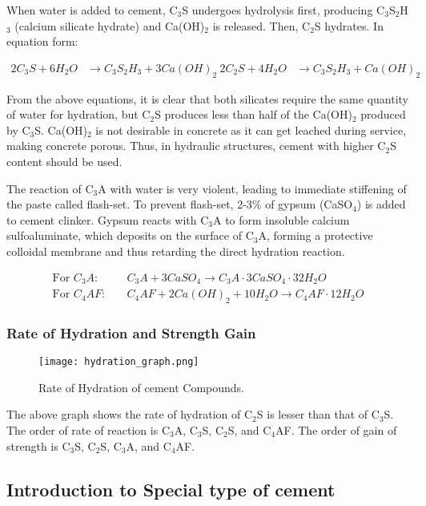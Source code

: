 \documentclass[a4paper,11pt]{book}
\begin{document}
When water is added to cement, C$_3$S undergoes hydrolysis first, producing C$_3$S$_2$H$_3$ (calcium silicate hydrate) and Ca(OH)$_2$ is released. Then, C$_2$S hydrates. In equation form:

\begin{align*}
2C_3S + 6H_2O &\rightarrow C_3S_2H_3 + 3Ca(OH)_2 \
2C_2S + 4H_2O &\rightarrow C_3S_2H_3 + Ca(OH)_2
\end{align*}

From the above equations, it is clear that both silicates require the same quantity of water for hydration, but C$_2$S produces less than half of the Ca(OH)$_2$ produced by C$_3$S. Ca(OH)$_2$ is not desirable in concrete as it can get leached during service, making concrete porous. Thus, in hydraulic structures, cement with higher C$_2$S content should be used.

The reaction of C$_3$A with water is very violent, leading to immediate stiffening of the paste called flash-set. To prevent flash-set, 2-3\% of gypsum (CaSO$_4$) is added to cement clinker. Gypsum reacts with C$_3$A to form insoluble calcium sulfoaluminate, which deposits on the surface of C$_3$A, forming a protective colloidal membrane and thus retarding the direct hydration reaction.

\begin{align*}
\text{For } C_3A: & \quad C_3A + 3CaSO_4 \rightarrow C_3A\cdot3CaSO_4\cdot32H_2O \
\\
\text{For } C_4AF: & \quad C_4AF + 2Ca(OH)_2 + 10H_2O \rightarrow C_4AF\cdot12H_2O
\end{align*}

\subsubsection*{Rate of Hydration and Strength Gain}
\begin{figure}[h]
    \centering
    \texttt{[image: hydration\_graph.png]}
    \caption{Rate of Hydration of cement Compounds.}
    \label{fig:example}
\end{figure}
The above graph shows the rate of hydration of C$_2$S is lesser than that of C$_3$S. The order of rate of reaction is C$_3$A, C$_3$S, C$_2$S, and C$_4$AF. The order of gain of strength is C$_3$S, C$_2$S, C$_3$A, and C$_4$AF.


\subsection{Introduction to Special type of cement}
\end{document}
